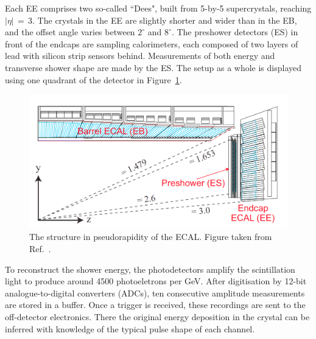 Each EE comprises two so-called ``Dees", built from 5-by-5 supercrystals, reaching $|\eta|\,=\,3$.
The crystals in the EE are slightly shorter and wider than in the EB, 
and the offset angle varies between $2^{\circ}$ and $8^{\circ}$.
The preshower detectors (ES) in front of the endcaps are sampling calorimeters, 
each composed of two layers of lead with silicon strip sensors behind. %
Measurements of both energy and transverse shower shape are made by the ES.
The setup as a whole is displayed using one quadrant of the detector in Figure~\ref{fig:detector_ECALquadrant}.

\begin{figure}[h!]
  \centering
  \includegraphics[width=\textwidth]{Figures/Detector/ECALquadrant.png}
  \caption[The structure in pseudorapidity of the CMS ECAL.]
  {
    The structure in pseudorapidity of the ECAL.
    Figure taken from Ref.~\cite{ECALperformance}.
  }
  \label{fig:detector_ECALquadrant}
\end{figure}

To reconstruct the shower energy, the photodetectors amplify the scintillation light to produce around 4500 photoeletrons per GeV.
After digitisation by 12-bit analogue-to-digital converters (ADCs), ten consecutive amplitude measurements are stored in a buffer.
Once a trigger is received, these recordings are sent to the off-detector electronics. 
There the original energy deposition in the crystal can be inferred with knowledge of the typical pulse shape of each channel.


